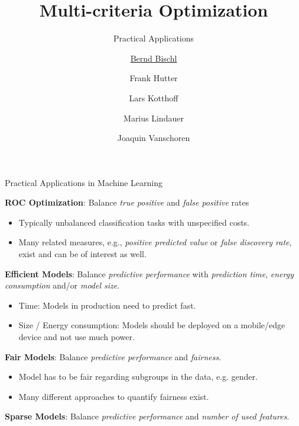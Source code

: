 


\newcommand{\q}[0]{\mathbf{q}}
\newcommand{\Xspace}[0]{\mathcal{X}}
\newcommand{\inducer}{\mathcal{I}}

\title[AutoML: Overview]{Multi-criteria Optimization}
\subtitle{Practical Applications}
\author[Bernd Bischl]{\underline{Bernd Bischl} \and Frank Hutter \and Lars Kotthoff\newline \and Marius Lindauer \and Joaquin Vanschoren}
\institute{}
\date{}






	\maketitle

\begin{frame}[allowframebreaks]{Practical Applications in Machine Learning}

    \textbf{ROC Optimization}: Balance \emph{true positive} and \emph{false positive} rates
  \begin{itemize}
    \item Typically unbalanced classification tasks with unspecified costs.
    \item Many related measures, e.g., \emph{positive predicted value} or \emph{false discovery rate}, exist and can be of interest as well.
  \end{itemize}

\textbf{Efficient Models}:
    Balance \emph{predictive performance} with \emph{prediction time}, \emph{energy consumption} and/or \emph{model size}.
  \begin{itemize}
    \item Time: Models in production need to predict fast.
    \item Size / Energy consumption: Models should be deployed on a mobile/edge device and not use much power.
  \end{itemize}

\textbf{Fair Models}:
  Balance \emph{predictive performance} and \emph{fairness}.
  \begin{itemize}
    \item Model has to be fair regarding subgroups in the data, e.g. gender.
    \item Many different approaches to quantify fairness exist.
  \end{itemize}

    \textbf{Sparse Models}: Balance \emph{predictive performance} and \emph{number of used features}.

\end{frame}

